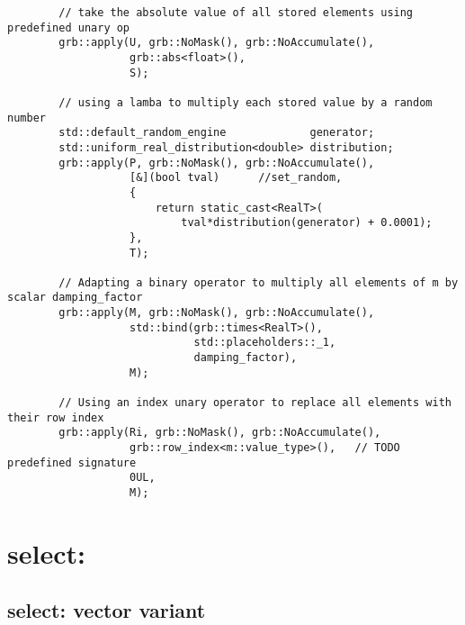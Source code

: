 \begin{verbatim}
        // take the absolute value of all stored elements using predefined unary op
        grb::apply(U, grb::NoMask(), grb::NoAccumulate(),
                   grb::abs<float>(),
                   S);

        // using a lamba to multiply each stored value by a random number
        std::default_random_engine             generator;
        std::uniform_real_distribution<double> distribution;
        grb::apply(P, grb::NoMask(), grb::NoAccumulate(),
                   [&](bool tval)      //set_random,
                   {
                       return static_cast<RealT>(
                           tval*distribution(generator) + 0.0001);
                   },
                   T);

        // Adapting a binary operator to multiply all elements of m by scalar damping_factor
        grb::apply(M, grb::NoMask(), grb::NoAccumulate(),
                   std::bind(grb::times<RealT>(),
                             std::placeholders::_1,
                             damping_factor),
                   M);
                   
        // Using an index unary operator to replace all elements with their row index
        grb::apply(Ri, grb::NoMask(), grb::NoAccumulate(),
                   grb::row_index<m::value_type>(),   // TODO predefined signature 
                   0UL,
                   M);

\end{verbatim}


\section{{\sf select}: }


\subsection{{\sf select}: vector variant}

\paragraph{\syntax}

